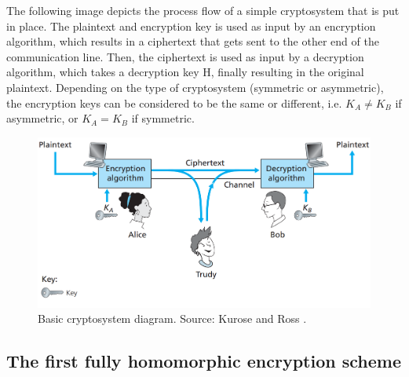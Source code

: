 The following image depicts the process flow of a simple cryptosystem that is put in place. The plaintext and encryption key is used as input by an encryption algorithm, which results in a ciphertext that gets sent to the other end of the communication line. Then, the ciphertext is used as input by a decryption algorithm, which takes a decryption key H, finally resulting in the original plaintext. Depending on the type of cryptosystem (symmetric or asymmetric), the encryption keys can be considered to be the same or different, i.e. $K_{A}\ne K_{B}$ if asymmetric, or $K_{A} = K_{B}$ if symmetric.

\begin{figure}[H]
  \centerline{\includegraphics[width=14cm]{img/basic_crypto}}
  \caption[Basic cryptosystem diagram]{Basic cryptosystem diagram. Source: Kurose and Ross \cite{kurose2010computer}.}
\end{figure}

\subsection{The first fully homomorphic encryption scheme}


